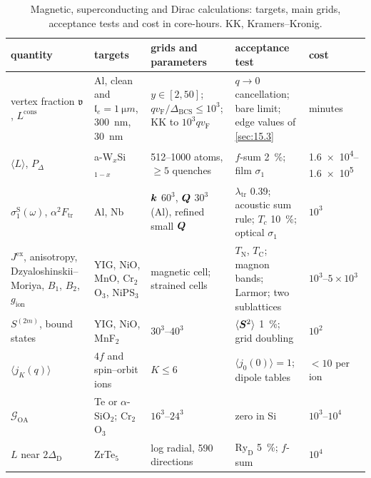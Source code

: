 \begin{table}[t]
  \centering
  \caption{Magnetic, superconducting and Dirac calculations: targets, main grids, acceptance tests and cost in core-hours. KK, Kramers--Kronig.}
  \label{tab:E20-params}
  \small
  \setlength{\tabcolsep}{4pt}
  \begin{tabular}{p{}p{}p{}p{}p{}}
    \toprule
    quantity & targets & grids and parameters & acceptance test & cost \\
    \midrule
    vertex fraction $\mathfrak{v}$, $L^{\mathrm{cons}}$ & Al, clean and $\mathfrak{l}_e = \SI{1}{\micro m}$, \SI{300}{nm}, \SI{30}{nm} & $y \in [2,50]$; $qv_{\mathrm{F}}/\Delta_{\mathrm{BCS}} \le 10^3$; KK to $10^3qv_{\mathrm{F}}$ & $q\to0$ cancellation; bare limit; edge values of \cref{sec:15.3} & minutes \\
    $\langle L\rangle$, $P_\Delta$ & a-W$_x$Si$_{1-x}$ & 512--1000 atoms, ${\ge}5$ quenches & $f$-sum \SI{2}{\percent}; film $\sigma_1$ & \num{1.6e4}--\num{1.6e5} \\
    $\sigma_1^{\mathrm{S}}(\omega)$, $\alpha^2F_{\mathrm{tr}}$ & Al, Nb & $\bm{k}$ $60^3$, $\bm{Q}$ $30^3$ (Al), refined small $\bm{Q}$ & $\lambda_{\mathrm{tr}}$ 0.39; acoustic sum rule; $T_c$ \SI{10}{\percent}; optical $\sigma_1$ & $10^3$ \\
    $J^{\mathrm{ex}}$, anisotropy, Dzyaloshinskii--Moriya, $B_1$, $B_2$, $g_{\mathrm{ion}}$ & YIG, NiO, MnO, Cr$_2$O$_3$, NiPS$_3$ & magnetic cell; strained cells & $T_{\mathrm{N}}$, $T_{\mathrm{C}}$; magnon bands; Larmor; two sublattices & $10^3$--$5\times10^3$ \\
    $S^{(2m)}$, bound states & YIG, NiO, MnF$_2$ & $30^3$--$40^3$ & $\langle\bm{S}^2\rangle$ \SI{1}{\percent}; grid doubling & $10^2$ \\
    $\langle j_K(q)\rangle$ & $4f$ and spin--orbit ions & $K \le 6$ & $\langle j_0(0)\rangle = 1$; dipole tables & ${<}10$ per ion \\
    $\mathcal{G}_{\mathrm{OA}}$ & Te or $\alpha$-SiO$_2$; Cr$_2$O$_3$ & $16^3$--$24^3$ & zero in Si & $10^3$--$10^4$ \\
    $L$ near $2\Delta_{\mathrm{D}}$ & ZrTe$_5$ & log radial, 590 directions & $\mathrm{Ry}_{\mathrm{D}}$ \SI{5}{\percent}; $f$-sum & $10^4$ \\
    \bottomrule
  \end{tabular}
\end{table}
